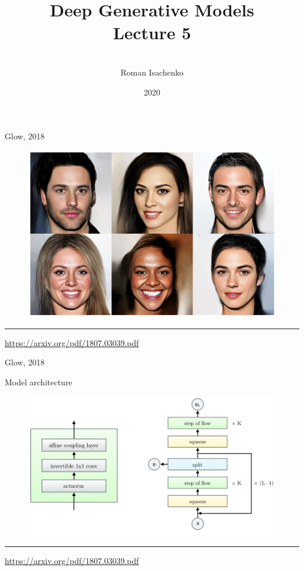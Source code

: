 \documentclass{beamer}
\title[\hbox to 56mm{Deep Generative Models  \hfill\insertframenumber\,/\,\inserttotalframenumber}]
{Deep Generative Models \\ Lecture 5}
\author[Roman Isachenko]{\\Roman Isachenko}
\institute[MIPT]{Moscow Institute of Physics and Technology \\
}
\date{2020}
\begin{document}
\begin{frame}
\titlepage
\end{frame}
\begin{frame}{Glow, 2018}
	\begin{figure}
		\centering
		\includegraphics[width=\linewidth]{figs/glow_faces.png}
	\end{figure}
	\vfill
	\hrule\medskip
	{\scriptsize \href{https://arxiv.org/pdf/1807.03039.pdf}{https://arxiv.org/pdf/1807.03039.pdf}} 
\end{frame}
\begin{frame}{Glow, 2018}
	\begin{block}{Model architecture}
		\begin{figure}
			\centering
			\includegraphics[width=\linewidth]{figs/glow_block.png}
		\end{figure}
	\end{block}
	\vfill
	\hrule\medskip
	{\scriptsize \href{https://arxiv.org/pdf/1807.03039.pdf}{https://arxiv.org/pdf/1807.03039.pdf}}   
\end{frame}
\end{document}
